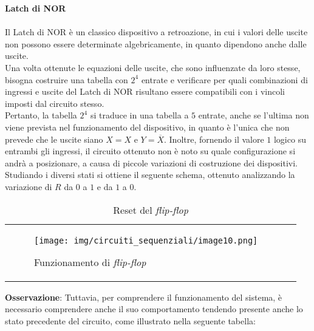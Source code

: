 \documentclass[a4paper]{extarticle}
\renewcommand\arraystretch{}
\begin{document}
\vspace{1em}
\noindent
\textbf{Latch di NOR}\\\\
Il Latch di NOR è un classico dispositivo a retroazione, in cui i valori delle uscite non possono essere determinate algebricamente, in quanto dipendono anche dalle uscite.\\
Una volta ottenute le equazioni delle uscite, che sono influenzate da loro stesse, bisogna costruire una tabella con \(2^4\) entrate e verificare per quali combinazioni di ingressi e uscite del Latch di NOR risultano essere compatibili con i vincoli imposti dal circuito stesso.\\
Pertanto, la tabella \(2^4\) si traduce in una tabella a \(5\) entrate, anche se l'ultima non viene prevista nel funzionamento del dispositivo, in quanto è l'unica che non prevede che le uscite siano \(X = X\) e \(Y = \overline{X}\). Inoltre, fornendo il valore \(1\) logico su entrambi gli ingressi, il circuito ottenuto non è noto su quale configurazione si andrà a posizionare, a causa di piccole variazioni di costruzione dei dispositivi.\\
Studiando i diversi stati si ottiene il seguente schema, ottenuto analizzando la variazione di \(R\) da \(0\) a \(1\) e da \(1\) a \(0\).

\begin{table}[H]
    \centering
    \setlength{\tabcolsep}{10pt}
    \renewcommand{\arraystretch}{1.4}
    \begin{tabularx}{\textwidth}{PP}
    {
        \begin{figure}[H]
            \centering
                \texttt{[image: img/circuiti\_sequenziali/image10.png]}
            \caption{Funzionamento di \textit{flip-flop}}
            \label{fig:flip-flop}
        \end{figure}
    }
    &
    {

    }
    \end{tabularx}
    \caption{Reset del \textit{flip-flop}}
    \label{tab:reset}
\end{table}

\vspace{1em}
\noindent
\textbf{Osservazione}: Tuttavia, per comprendere il funzionamento del sistema, è necessario comprendere anche il suo comportamento tendendo presente anche lo stato precedente del circuito, come illustrato nella seguente tabella:
\end{document}
